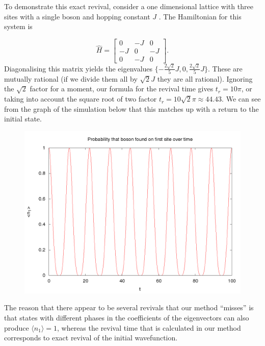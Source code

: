 \documentclass[a4paper,10pt]{article}
\begin{document}
To demonstrate this exact revival, consider a one dimensional lattice with three sites with a single boson and hopping constant $J$ . The Hamiltonian for this system is

\begin{equation}
\hat{H}= \begin{bmatrix}
 0 & -J & 0 \\
 -J & 0 & -J\\
 0 & -J & 0
 \end{bmatrix}.
\end{equation}
Diagonalising this matrix yields the eigenvalues $\{-\frac{2\sqrt{2}}{5}J,0,\frac{2\sqrt{2}}{5}J\}$. These are mutually rational (if we divide them all by $\sqrt{2}J$ they are all rational). Ignoring 
the $\sqrt{2}$ factor for a moment, our formula for the revival time gives $t_r=10\pi$, or taking into account the square root of two factor $t_r=10\sqrt{2}\pi\approx44.43$. We can see from the 
graph of the simulation below that this matches up with a return to the initial state.

\begin{figure}[H]
 \begin{center}
 \includegraphics[width=1.0\textwidth]{showing_revival_3by1}
 \end{center}
\end{figure}

The reason that there appear to be several revivals that our method ``misses'' is that states with different phases in the coefficients of the eigenvectors can also produce $\langle n_1 \rangle =1$, whereas the revival time that is 
calculated in our method corresponds to exact revival of the initial wavefunction.
\end{document}

